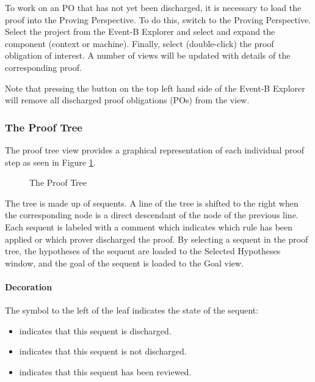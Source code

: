 To work on an PO that has not yet been discharged, it is necessary to load the proof into the Proving Perspective. To do this, switch to the Proving Perspective. Select the project from the Event-B Explorer and select and expand the component (context or machine). Finally, select (double-click) the proof obligation of interest. A number of views will be updated with details of the corresponding proof. 

Note that pressing the  button on the top left hand side of the \textsf{Event-B Explorer} will remove all discharged proof obligations (POs) from the view. 

\subsubsection{The Proof Tree}
\label{proof_tree_view}

The proof tree view provides a graphical representation of each individual proof step as seen in Figure \ref{fig_ref_01_proving_perspective2}.

\begin{figure}[!ht]
\begin{center}
	\caption{The Proof Tree}
	\label{fig_ref_01_proving_perspective2}
\end{center}
\end{figure}

The tree is made up of sequents. A line of the tree is shifted to the right when the corresponding node is a direct descendant of the node of the previous line. Each sequent is labeled with a comment which indicates which rule has been applied or which prover discharged the proof. By selecting a sequent in the proof tree, the hypotheses of the sequent are loaded to the \textsf{Selected Hypotheses window}, and the goal of the sequent is loaded to the \textsf{Goal view}.

\paragraph{Decoration}
The symbol to the left of the leaf indicates the state of the sequent:
\begin{itemize}
	\item {} indicates that this sequent is discharged.
	\item {} indicates that this sequent is not discharged.
	\item {} indicates that this sequent has been reviewed. 
\end{itemize}

